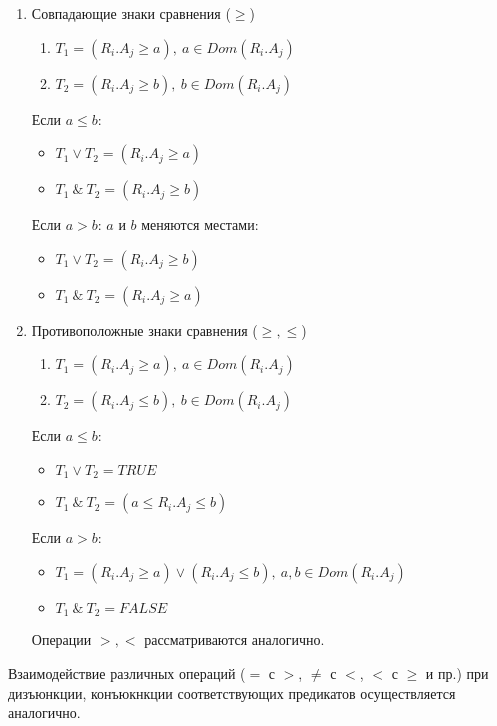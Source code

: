 \documentclass[10pt,a4paper]{article}
\def \n #1{\mathit{#1}}
\begin{document}
\begin{enumerate}
\begin{enumerate}[label=\Roman*]
  \item Совпадающие знаки сравнения ($\geq$)
  \begin{enumerate}[label=\arabic*:]
    \item $T_1 = (R_i.A_j \geq a),\ a \in Dom(R_i.A_j)$
    \item $T_2 = (R_i.A_j \geq b),\ b \in Dom(R_i.A_j)$
  \end{enumerate}
  Если $a \le b$:
  \begin{itemize}
    \item $T_1 \vee T_2 = (R_i.A_j \geq a)$
    \item $T_1\ \&\ T_2 = (R_i.A_j \geq b)$
  \end{itemize}
  Если $a > b$: $a$ и $b$ меняются местами:
  \begin{itemize}
    \item $T_1 \vee T_2 = (R_i.A_j \geq b)$
    \item $T_1\ \&\ T_2 = (R_i.A_j \geq a)$
  \end{itemize}

  \item Противоположные знаки сравнения ($\geq, \leq$)
  \begin{enumerate}[label=\arabic*:]
    \item $T_1 = (R_i.A_j \geq a),\ a \in Dom(R_i.A_j)$
    \item $T_2 = (R_i.A_j \leq b),\ b \in Dom(R_i.A_j)$
  \end{enumerate}
  Если $a \le b$:
  \begin{itemize}
    \item $T_1 \vee T_2 = \n{TRUE}$
    \item $T_1\ \&\ T_2 = (a \leq R_i.A_j \leq b)$
  \end{itemize}

  Если $a > b$:
  \begin{itemize}
    \item $T_1 = (R_i.A_j \geq a) \vee (R_i.A_j \leq b),\ a, b \in Dom(R_i.A_j)$
    \item $T_1\ \&\ T_2 = \n{FALSE}$
  \end{itemize}

  Операции $>, <$ рассматриваются аналогично.
\end{enumerate}
Взаимодействие различных операций ($=$ с $>$, $\neq$ с $<$, $<$ с $\geq$ и пр.) при дизъюнкции,
конъюкнкции соответствующих предикатов осуществляется аналогично.



\end{enumerate}
\end{document}
